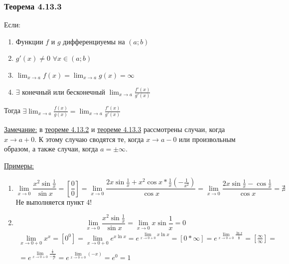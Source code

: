 \documentclass[12pt]{article}
\begin{document}
    \subsubsection*{Теорема 4.13.3}\label{th:4.13.3}
    \noindent Если: \begin{enumerate}
        \item Функции $f$ и $g$ дифференциуемы на $(a;b)$
        \item $g'(x) \ne 0$ $\forall x \in (a;b)$
        \item $\lim_{x\to a} f(x) = \lim_{x\to a}g(x) = \infty$
        \item $\exists$ конечный или бесконечный $\lim_{x\to a} \frac{f'(x)}{g'(x)}$
    \end{enumerate}
    Тогда $\exists \lim_{x\to a}\frac{f(x)}{g(x)} = \lim_{x\to a}\frac{f'(x)}{g'(x)}$\par\noindent
    \underline{Замечание:} в \hyperref[th:4.13.2]{теореме 4.13.2} и \hyperref[th:4.13.3]{теореме 4.13.3} рассмотрены случаи, когда $x \to a + 0$. К этому случаю сводятся те, когда $x \to a - 0$ или произвольным образом, а также случаи, когда $a = \pm \infty$.\par\noindent
    \underline{Примеры:} \begin{enumerate}
        \item \[ \lim_{x\to 0} \frac{x^2 \sin \frac{1}{x}}{\sin x} = \left[\frac{0}{0}\right] = \lim_{x\to 0}\frac{2x \sin \frac{1}{x} + x^2 \cos x * \frac{1}{x} (-\frac{1}{x^2})}{\cos x} = \lim_{x\to 0} \frac{2x \sin \frac{1}{x} - \cos \frac{1}{x}}{\cos x} = \nexists \]
        Не выполняется пункт 4!
        \item \[ \lim_{x\to 0}\frac{x^2 \sin \frac{1}{x}}{\sin x} = \lim_{x\to 0}x \sin \frac{1}{x} = 0 \]
        \begin{multline*}
            \lim_{x\to 0+0}x^x = \left[0^0\right] = \lim_{x\to 0 + 0}e^{x\ln x} = e^{\lim_{x\to 0 + 0}x \ln x} = \left[ 0 * \infty \right] = e^{\lim_{x\to 0 + 0}\frac{\ln x}{\frac{1}{x}}} = \left[ \frac{\infty}{\infty} \right] =\\= e^{\lim_{x\to 0 + 0}\frac{\frac{1}{x}}{-\frac{1}{x^2}}} = e^{\lim_{x\to 0 + 0}(-x)} = e^0 = 1
        \end{multline*}
    \end{enumerate} 
\end{document}
